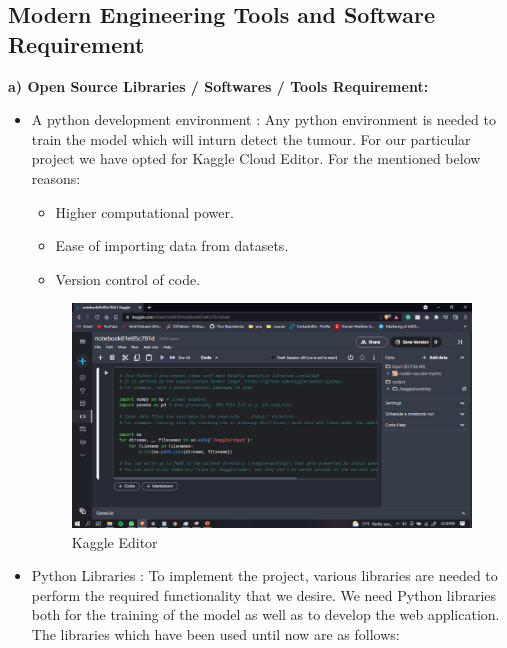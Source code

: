 \subsection{Modern Engineering Tools and Software Requirement}
{\textbf{a) Open Source Libraries / Softwares / Tools Requirement:}}
\begin{itemize}
    \item A python development environment : Any python environment is needed to train the model which will inturn detect the tumour. For our particular project we have opted for Kaggle Cloud Editor. For the mentioned below reasons:
        \begin{itemize}
            \item Higher computational power.
            \item Ease of importing data from datasets.
            \item Version control of code.
        \end{itemize}
        \begin{figure}[H]
        \includegraphics[scale=0.3]{Photos/Kaggle_Editor.png}
        \caption{Kaggle Editor} \label{fig:ishan}
        \end{figure}
    \item Python Libraries : To implement the project, various libraries are needed to perform the required functionality that we desire. We need Python libraries both for the training of the model as well as to develop the web application. The libraries which have been used until now are as follows:
        \begin{table}[h!]

\end{table}
\end{itemize}

